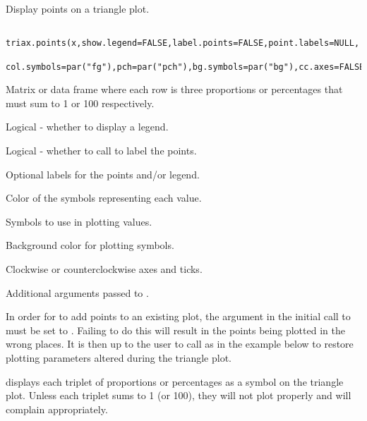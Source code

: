 \begin{Description}\relax
Display points on a triangle plot.
\end{Description}
\begin{Usage}
\begin{verbatim}
 triax.points(x,show.legend=FALSE,label.points=FALSE,point.labels=NULL,
 col.symbols=par("fg"),pch=par("pch"),bg.symbols=par("bg"),cc.axes=FALSE,...)
\end{verbatim}
\end{Usage}
\begin{Arguments}
\begin{ldescription}
\item[\code{x}] Matrix or data frame where each row is three proportions or 
percentages that must sum to 1 or 100 respectively.
\item[\code{show.legend}] Logical - whether to display a legend.
\item[\code{label.points}] Logical - whether to call 
to label the points.
\item[\code{point.labels}] Optional labels for the points and/or legend.
\item[\code{col.symbols}] Color of the symbols representing each value.
\item[\code{pch}] Symbols to use in plotting values.
\item[\code{bg.symbols}] Background color for plotting symbols.
\item[\code{cc.axes}] Clockwise or counterclockwise axes and ticks.
\item[\code{...}] Additional arguments passed to .
\end{ldescription}
\end{Arguments}
\begin{Details}\relax
In order for  to add points to an existing plot,
the argument  in the initial call to  
must be set to . Failing to do this will result in the
points being plotted in the wrong places. It is then up to the user
to call  as in the example below to restore plotting
parameters altered during the triangle plot.

 displays each triplet of proportions or percentages
as a symbol on the triangle plot. Unless each triplet sums to 1 
(or 100), they will not plot properly and  will 
complain appropriately.
\end{Details}
